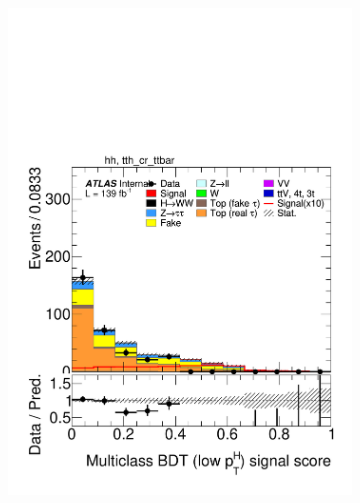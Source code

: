 \begin{figure}[h]
  \centering
  \begin{subfigure}[b]{0.32\textwidth}
    \includegraphics[width=\textwidth]{images/sr_cr_plots/plot_tth_signal_multiclass_lt200_hh_tth_cr_ttbar.pdf}
    \caption{}
  \end{subfigure}
  \begin{subfigure}[b]{0.32\textwidth}

\end{subfigure}
\end{figure}
